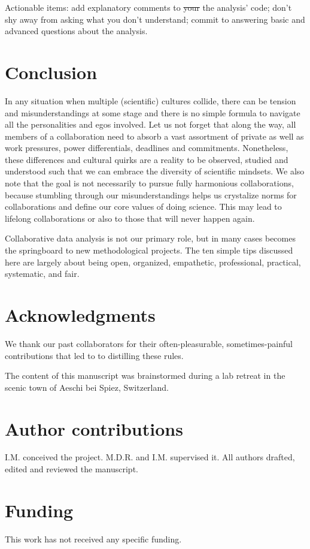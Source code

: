 \documentclass{article}
\begin{document}
Actionable items: add explanatory comments to {\color{red}\sout{your} the} analysis’ code; don’t shy away from asking what you don’t understand; commit to answering basic and advanced questions about the analysis.

\section*{Conclusion} %

In any situation when multiple (scientific) cultures collide, there can be tension and misunderstandings at some stage and there is no simple formula to navigate all the personalities and egos involved. Let us not forget that along the way, all members of a collaboration need to absorb a vast assortment of private as well as work pressures, power differentials, deadlines and commitments. Nonetheless, these differences and cultural quirks are a reality to be observed, studied and understood such that we can embrace the diversity of scientific mindsets. We also note that the goal is not necessarily to pursue fully harmonious collaborations, because stumbling through our misunderstandings helps us crystalize norms for collaborations and define our core values of doing science. This may lead to lifelong collaborations or also to those that will never happen again.

Collaborative data analysis is not our primary role, but in many cases becomes the springboard to new methodological projects. The ten simple tips discussed here are largely about being open, organized, empathetic, professional, practical, systematic, and fair.

\section*{Acknowledgments} %

We thank our past collaborators for their often-pleasurable, sometimes-painful contributions that led to to distilling these rules.

The content of this manuscript was brainstormed during a lab retreat in the scenic town of Aeschi bei Spiez, Switzerland.

\section*{Author contributions}

I.M. conceived the project. M.D.R. and I.M. supervised it. All authors drafted, edited and reviewed the manuscript.

\section*{Funding}

This work has not received any specific funding.

  
  

\clearpage

\appendix


\end{document}
